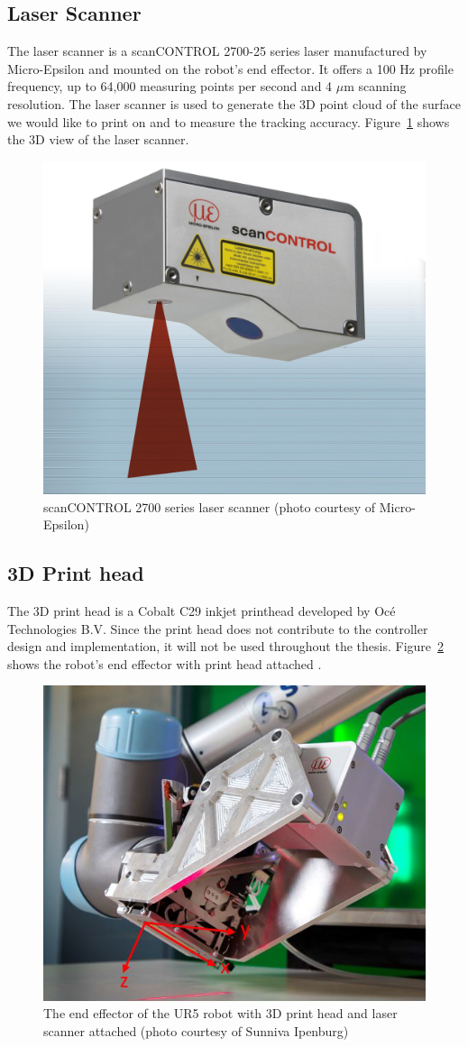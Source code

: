 \subsection{Laser Scanner}
The laser scanner is a scanCONTROL 2700-25 series laser manufactured by Micro-Epsilon and mounted on the robot's end effector. It offers a 100 Hz profile frequency, up to 64,000 measuring points per second and 4 $ \mu $m scanning resolution. The laser scanner is used to generate the \acs{3D} point cloud of the surface we would like to print on and to measure the tracking accuracy. Figure~\ref{fig:scanCONTROL} shows the \acs{3D} view of the laser scanner.

\begin{figure}
	\centering
	\includegraphics[width=0.5\linewidth]{scanCONTROL}
	\caption{scanCONTROL 2700 series laser scanner (photo courtesy of Micro-Epsilon)}
	\label{fig:scanCONTROL}
\end{figure}

\subsection{3D Print head}
The \acs{3D} print head is a Cobalt C29 inkjet printhead developed by Oc{\'e} Technologies B.V.  Since the print head does not contribute to the controller design and implementation, it will not be used throughout the thesis. Figure~\ref{fig:ur5-endeffector} shows the robot's end effector with print head attached \cite{sunniva2013}.


\begin{figure}
\centering
\includegraphics[width=0.5\linewidth]{ur5}
\caption{The end effector of the UR5 robot with \acs{3D} print head and laser scanner attached (photo courtesy of Sunniva Ipenburg)}
\label{fig:ur5-endeffector}
\end{figure}

